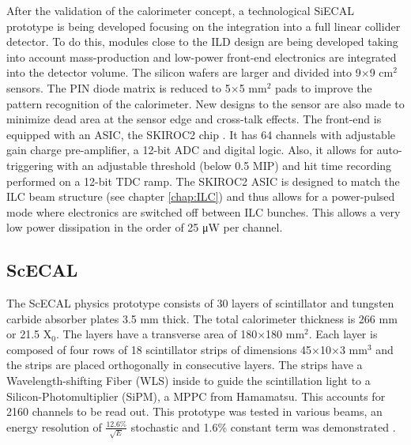 After the validation of the calorimeter concept, a technological SiECAL prototype is being developed focusing on the integration into a full linear collider detector. To do this, modules close to the ILD design are being developed taking into account mass-production and low-power front-end electronics are integrated into the detector volume. The silicon wafers are larger and divided into 9$\times$9 cm$^2$ sensors. The PIN diode matrix is reduced to 5$\times$5 mm$^2$ pads to improve the pattern recognition of the calorimeter. New designs to the sensor are also made to minimize dead area at the sensor edge and cross-talk effects. The front-end is equipped with an ASIC, the SKIROC2 chip \cite{1748-0221-6-12-C12040}. It has 64 channels with adjustable gain charge pre-amplifier, a 12-bit ADC and digital logic. Also, it allows for auto-triggering with an adjustable threshold (below 0.5 MIP) and hit time recording performed on a 12-bit TDC ramp. The SKIROC2 ASIC is designed to match the ILC beam structure (see chapter \ref{chap:ILC}) and thus allows for a power-pulsed mode where electronics are switched off between ILC bunches. This allows a very low power dissipation in the order of 25 \si{\micro\watt} per channel.

\subsection{ScECAL}
\label{subsec:ScECAL}

The ScECAL physics prototype consists of 30 layers of scintillator and tungsten carbide absorber plates 3.5 mm thick. The total calorimeter thickness is 266 mm or 21.5 X$_0$. The layers have a transverse area of 180$\times$180 mm$^2$. Each layer is composed of four rows of 18 scintillator strips of dimensions 45$\times$10$\times$3 mm$^3$ and the strips are placed orthogonally in consecutive layers. The strips have a Wavelength-shifting Fiber (WLS) inside to guide the scintillation light to a Silicon-Photomultiplier (SiPM), a MPPC from Hamamatsu. This accounts for 2160 channels to be read out. This prototype was tested in various beams, an energy resolution of $\frac{12.6\%}{\sqrt{E}}$ stochastic and 1.6\% constant term was demonstrated \cite{1707.07126v2}.


